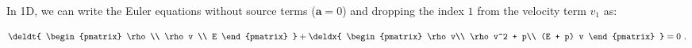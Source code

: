 In 1D, we can write the Euler equations without source terms ($\mathbf{a} = 0$) and dropping the
index $1$ from the velocity term $v_1$ as:

\begin{align}
	\deldt{
		\begin{pmatrix}
			\rho \\ \rho v \\ E
		\end{pmatrix}
		}
	+ \deldx {
		\begin{pmatrix}
			\rho v\\
			\rho v^2  + p\\
			(E + p) v
		\end{pmatrix}
	} = 0 \ .
	\label{eq:euler-equations-1D}
\end{align}
